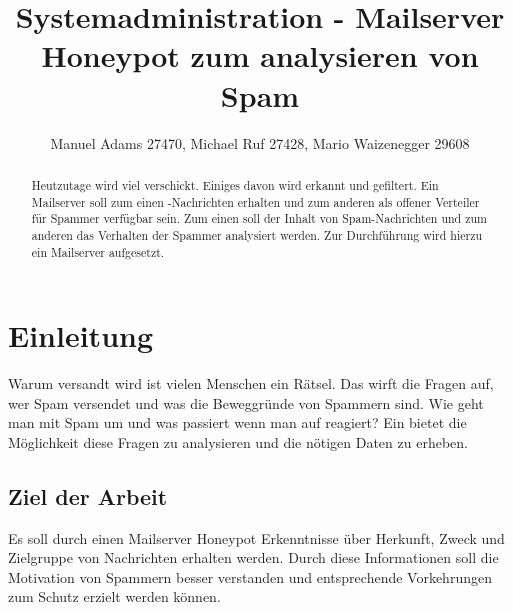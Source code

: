 \documentclass[a4paper,11pt,singlespacing]{article}
\begin{document}

\title{Systemadministration - Mailserver Honeypot zum analysieren von Spam}
\author{Manuel Adams 27470, Michael Ruf 27428, Mario Waizenegger 29608}
\maketitle
\begin{abstract}
Heutzutage wird viel  verschickt. Einiges davon wird erkannt und gefiltert.
Ein Mailserver soll zum einen -Nachrichten erhalten und zum anderen als offener Verteiler für Spammer verfügbar sein.
Zum einen soll der Inhalt von Spam-Nachrichten und zum anderen das Verhalten der Spammer analysiert werden.
Zur Durchführung wird hierzu ein Mailserver  aufgesetzt.
\end{abstract}

\newpage

\tableofcontents

\newpage
{}

\section{Einleitung}\label{sec:Einleitung}
	Warum  versandt wird ist vielen Menschen ein Rätsel.
	Das wirft die Fragen auf, wer Spam versendet und was die Beweggründe von Spammern sind.
	Wie geht man mit Spam um und was passiert wenn man auf  reagiert?
	Ein   bietet die Möglichkeit diese Fragen zu analysieren und die nötigen Daten zu erheben.
	\\ %

	\subsection{Ziel der Arbeit}\label{sec:EinleitungZiel}
		Es soll durch einen Mailserver Honeypot Erkenntnisse über Herkunft, Zweck und Zielgruppe von  Nachrichten erhalten werden.
		Durch diese Informationen soll die Motivation von Spammern besser verstanden und entsprechende Vorkehrungen zum Schutz erzielt werden können.
	
\end{document}
